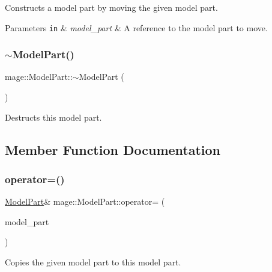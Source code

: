 Constructs a model part by moving the given model part.


\begin{DoxyParams}[1]{Parameters}
\mbox{\tt in}  & {\em model\+\_\+part} & A reference to the model part to move. \\
\hline
\end{DoxyParams}
\hypertarget{structmage_1_1_model_part_a3322c5c7924ec30be170ae1ed6dca550}{}\label{structmage_1_1_model_part_a3322c5c7924ec30be170ae1ed6dca550} 
\subsubsection{\texorpdfstring{$\sim$\+Model\+Part()}{~ModelPart()}}
{\footnotesize\ttfamily mage\+::\+Model\+Part\+::$\sim$\+Model\+Part (\begin{DoxyParamCaption}{ }\end{DoxyParamCaption})\hspace{0.3cm}{\ttfamily [default]}}

Destructs this model part. 

\subsection{Member Function Documentation}
\hypertarget{structmage_1_1_model_part_a37e9d66b701ed84111160bf5a003b658}{}\label{structmage_1_1_model_part_a37e9d66b701ed84111160bf5a003b658} 
\subsubsection{\texorpdfstring{operator=()}{operator=()}\hspace{0.1cm}{\footnotesize\ttfamily [1/2]}}
{\footnotesize\ttfamily \hyperlink{structmage_1_1_model_part}{Model\+Part}\& mage\+::\+Model\+Part\+::operator= (\begin{DoxyParamCaption}\item[{const \hyperlink{structmage_1_1_model_part}{Model\+Part} \&}]{model\+\_\+part }\end{DoxyParamCaption})\hspace{0.3cm}{\ttfamily [default]}}

Copies the given model part to this model part.


